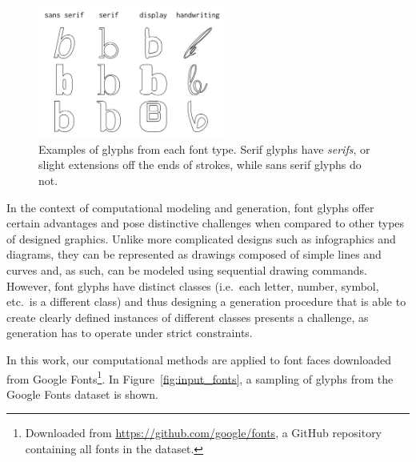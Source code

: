 \begin{figure}[h]
    \centering
	\includegraphics[width=0.55\textwidth]{figures/font_exs}
    \caption[Examples of glyphs from each font type]
    {Examples of glyphs from each font type. Serif glyphs have \textit{serifs}, or slight extensions off the ends of strokes, while sans serif glyphs do not.\label{fig:fonttypes}}
\end{figure}

In the context of computational modeling and generation, font glyphs offer certain advantages and pose distinctive challenges when compared to other types of designed graphics.
Unlike more complicated designs such as infographics and diagrams, they can be represented as drawings composed of simple lines and curves and, as such, can be modeled using sequential drawing commands.
However, font glyphs have distinct classes (i.e.\ each letter, number, symbol, etc.\ is a different class) and thus designing a generation procedure that is able to create clearly defined instances of different classes presents a challenge, as generation has to operate under strict constraints.

In this work, our computational methods are applied to font faces downloaded from Google Fonts\footnote{Downloaded from \url{https://github.com/google/fonts}, a GitHub repository containing all fonts in the dataset.}.
In Figure~\ref{fig:input_fonts}, a sampling of glyphs from the Google Fonts dataset is shown.

